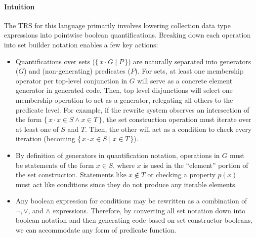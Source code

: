 \documentclass{article}
\newcommand{\bSet}[3]{%
  \{\, #1 \cdot #2 \mid #3 \, \}%
}
\newcommand{\bSetT}[2]{%
  \{\, #1 \cdot #2 \,\}%
}
\begin{document}
\paragraph{Intuition}
The TRS for this language primarily involves lowering collection data type expressions into pointwise boolean quantifications. Breaking down each operation into set builder notation enables a few key actions:
\begin{itemize}
  \item Quantifications over sets ($\bSet{x}{G}{P}$) are naturally separated into generators ($G$) and (non-generating) predicates ($P$). For sets, at least one membership operator per top-level conjunction in $G$ will serve as a concrete element generator in generated code. Then, top level disjunctions will select one membership operation to act as a generator, relegating all others to the predicate level. For example, if the rewrite system observes an intersection of the form $\bSetT{x}{x \in S \land x \in T}$, the set construction operation must iterate over at least one of $S$ and $T$. Then, the other will act as a condition to check every iteration (becoming $\bSet{x}{x \in S}{x \in T}$).
  \item By definition of generators in quantification notation, operations in $G$ must be statements of the form $x \in S$, where $x$ is used in the ``element'' portion of the set construction. Statements like $x \notin T$ or checking a property $p(x)$ must act like conditions since they do not produce any iterable elements.
  \item Any boolean expression for conditions may be rewritten as a combination of $\lnot, \lor$, and $\land$ expressions. Therefore, by converting all set notation down into boolean notation and then generating code based on set constructor booleans, we can accommodate any form of predicate function.
\end{itemize}
\end{document}
